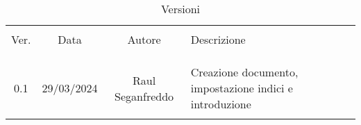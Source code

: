 \documentclass[italian,12pt]{article} %
\begin{document}


\newpage



\begin{table}[!h]
	\caption{Versioni}
	\begin{center}
		\begin{tabular}{ c c c p{9cm} }
			\hline\\[-2ex]
			Ver. & Data       & Autore             & Descrizione\\
			\\[-2ex] \hline \\[-1.5ex] \\
			0.1  & 29/03/2024 & Raul Seganfreddo & Creazione documento, impostazione indici e introduzione\\
			\\[-1.5ex] \hline
		\end{tabular}
	\end{center}
\end{table}

\newpage

\tableofcontents

\newpage
















\end{document}
